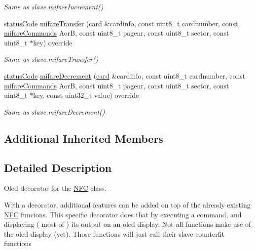 \begin{DoxyCompactItemize}
\begin{DoxyCompactList}\small\item\em Same as slave.\+mifare\+Increment() \end{DoxyCompactList}\item 
\mbox{\label{classnfc_1_1NfcOled_ab0a2321b094ce75503cde8f6bb7a91ef}} 
\hyperlink{declarations_8h_ae1d20c5a38cae82ccaa6a77be3fd264b}{status\+Code} \hyperlink{classnfc_1_1NfcOled_ab0a2321b094ce75503cde8f6bb7a91ef}{mifare\+Transfer} (\hyperlink{classcard}{card} \&cardinfo, const uint8\+\_\+t cardnumber, const \hyperlink{declarations_8h_a305b1a3bcfca65e2a82f0f9d24676835}{mifare\+Commands} AorB, const uint8\+\_\+t pagenr, const uint8\+\_\+t sector, const uint8\+\_\+t $\ast$key) override
\begin{DoxyCompactList}\small\item\em Same as slave.\+mifare\+Transfer() \end{DoxyCompactList}\item 
\mbox{\label{classnfc_1_1NfcOled_af6fd65859104e507b4c8c5718bc86d22}} 
\hyperlink{declarations_8h_ae1d20c5a38cae82ccaa6a77be3fd264b}{status\+Code} \hyperlink{classnfc_1_1NfcOled_af6fd65859104e507b4c8c5718bc86d22}{mifare\+Decrement} (\hyperlink{classcard}{card} \&cardinfo, const uint8\+\_\+t cardnumber, const \hyperlink{declarations_8h_a305b1a3bcfca65e2a82f0f9d24676835}{mifare\+Commands} AorB, const uint8\+\_\+t pagenr, const uint8\+\_\+t sector, const uint8\+\_\+t $\ast$key, const uint32\+\_\+t value) override
\begin{DoxyCompactList}\small\item\em Same as slave.\+mifare\+Decrement() \end{DoxyCompactList}\end{DoxyCompactItemize}
\subsection*{Additional Inherited Members}


\subsection{Detailed Description}
Oled decorator for the \hyperlink{classnfc_1_1NFC}{N\+FC} class. 

With a decorator, additional features can be added on top of the already existing \hyperlink{classnfc_1_1NFC}{N\+FC} funcions. This specific decorator does that by executing a command, and displaying ( most of ) it\textquotesingle{}s output on an oled display. Not all functions make use of the oled display (yet). Those functions will just call their slave counterfit functions 

